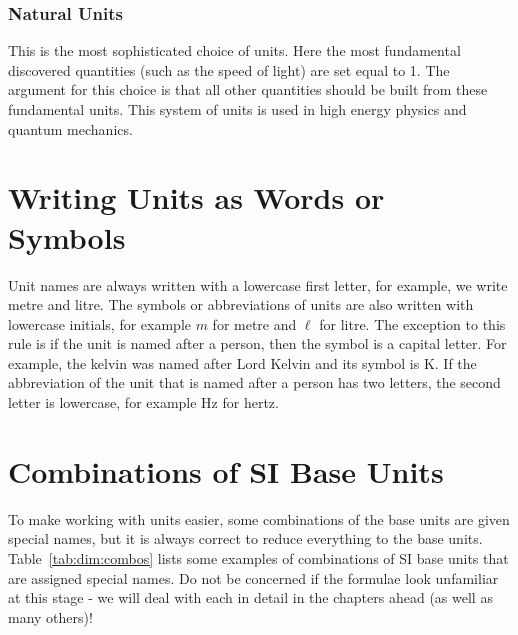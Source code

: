 \documentclass[10pt,a4paper,titlepage,twoside,openright]{report}
\begin{document}
\subsubsection{Natural Units}
This is the most sophisticated choice of units. Here the most
fundamental discovered quantities (such as the speed of light) are
set equal to 1. The argument for this choice is that all other
quantities should be built from these fundamental units. This
system of units is used in high energy physics and quantum
mechanics.

\section{Writing Units as Words or Symbols}
Unit names are always written with a lowercase first letter, for
example, we write metre and litre. The symbols or
abbreviations of units are also written with lowercase initials,
for example $m$ for metre and $\ell$ for litre. The exception to
this rule is if the unit is named after a person, then the
symbol is a capital letter. For example, the kelvin was named
after Lord Kelvin and its symbol is K. If the abbreviation of the unit that is named after a person has two letters, the second letter is lowercase, for example Hz for hertz.


\pagebreak[4]
\section{Combinations of SI Base Units}
To make working with units easier, some combinations of the base
units are given special names, but it is always correct to reduce
everything to the base units. Table~\ref{tab:dim:combos} lists
some examples of combinations of SI base units that are assigned
special names. Do not be concerned if the formulae look unfamiliar
at this stage - we will deal with each in detail in the chapters
ahead (as well as many others)!
\end{document}
